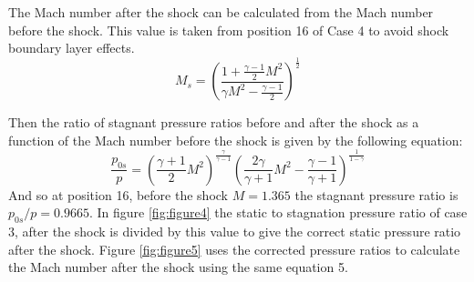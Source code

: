 \documentclass[8pt]{article}
\begin{document}
The Mach number after the shock can be calculated from the Mach number before the shock. This value is taken from position 16 of Case 4 to avoid shock boundary layer effects.
\begin{equation}
    M_s = \left( \frac{1 + \frac{\gamma - 1}{2} M^2}{\gamma M^2 - \frac{\gamma - 1}{2}} \right) ^ \frac{1}{2}
\end{equation}

Then the ratio of stagnant pressure ratios before and after the shock as a function of the Mach number before the shock is given by the following equation:
\begin{equation}
    \frac{p_{0s}}{p} = \left( \frac{\gamma + 1}{2} M^2 \right) ^ \frac{\gamma}{\gamma - 1} \left( \frac{2\gamma}{\gamma+1}M^2 - \frac{\gamma-1}{\gamma+1}\right) ^ \frac{1}{1 - \gamma}
\end{equation}
And so at position 16, before the shock $M = 1.365$ the stagnant pressure ratio is $p_{0s}/p = 0.9665$.
In figure \ref{fig:figure4} the static to stagnation pressure ratio of case 3, after the shock is divided by this value to give the correct static pressure ratio after the shock.
Figure \ref{fig:figure5} uses the corrected pressure ratios to calculate the Mach number after the shock using the same equation 5.
\end{document}
